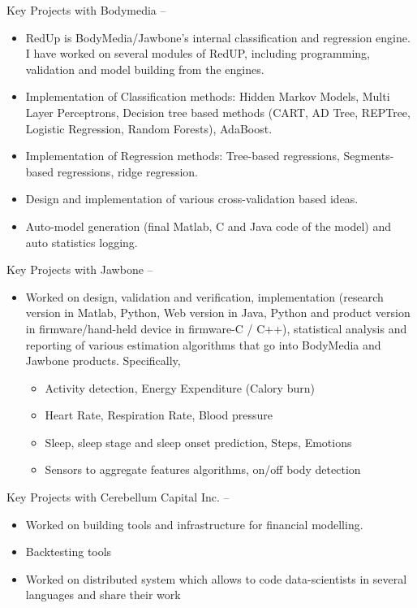 \documentclass[letterpaper,MMMyyyy,nonstop]{simpleresumecv}
\begin{document}
\begin{body}
\GapNoBreak
\BulletItem
Key Projects with Bodymedia
\hfill
{} --
\begin{detail}
  \begin{itemize}
      \item RedUp is BodyMedia/Jawbone’s internal classification and regression engine.
I have worked on several modules of RedUP, including programming, validation
and model building from the engines.
      \item Implementation of Classification methods: Hidden Markov Models, Multi Layer
Perceptrons, Decision tree based methods (CART, AD Tree, REPTree, Logistic
Regression, Random Forests), AdaBoost.
      \item Implementation of Regression methods: Tree-based regressions, Segments-based
regressions, ridge regression.
      \item Design and implementation of various cross-validation based ideas.
      \item Auto-model generation (final Matlab, C and Java code of the model) and auto statistics
logging.
\end{itemize}
\end{detail}

\GapNoBreak
\BulletItem
Key Projects with Jawbone
\hfill
{} --
\begin{detail}
\begin{itemize}
\item Worked on design, validation and verification, implementation (research version in Matlab,
Python, Web version in Java, Python and product version in firmware/hand-held device in
firmware-C / C++), statistical analysis and reporting of various estimation algorithms that go
into BodyMedia and Jawbone products. Specifically,
\begin{itemize}
   \item Activity detection, Energy Expenditure (Calory burn)
   \item Heart Rate, Respiration Rate, Blood pressure
   \item Sleep, sleep stage and sleep onset prediction, Steps, Emotions
   \item Sensors to aggregate features algorithms, on/off body detection
\end{itemize}

\end{itemize}

\GapNoBreak
\BulletItem
Key Projects with Cerebellum Capital Inc.
\hfill
{} --
\begin{detail}
\begin{itemize}
\item Worked on building tools and infrastructure for financial modelling.
\item Backtesting tools
\item Worked on distributed system which allows to code data-scientists in
several languages and share their work
\end{itemize}


\end{detail}
\end{detail}
\end{body}
\end{document}
